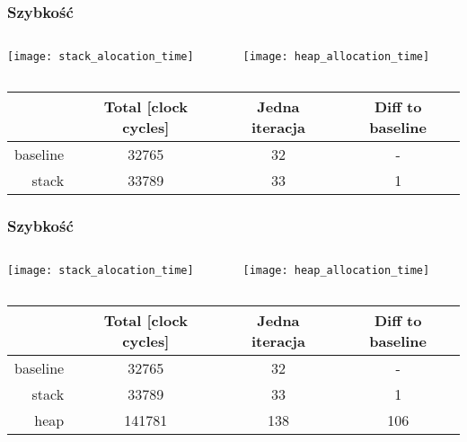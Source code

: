 \documentclass{beamer}
\begin{document}
\begin{frame}[t]
    \frametitle{Szybkość}
    \begin{columns}[t]
        \begin{column}[t]{0.5\textwidth}
            \begin{center}
                \texttt{[image: stack\_alocation\_time]}
            \end{center}
        \end{column}
        \begin{column}[t]{0.5\textwidth}
            \begin{center}
                \texttt{[image: heap\_allocation\_time]}
            \end{center}
        \end{column}
    \end{columns}
    \begin{center}
        \begin{tabular}{|| r | c | c | c ||}
        \hline
         & Total [clock cycles] & Jedna iteracja & Diff to baseline \\ [0.2ex] 
        \hline
        \hline
        baseline & 32765 & 32 & - \\
        \hline
        stack & 33789 & 33 & 1 \\
        \hline
        \end{tabular}
    \end{center}
\end{frame}
\begin{frame}[t]
    \frametitle{Szybkość}
    \begin{columns}[t]
        \begin{column}[t]{0.5\textwidth}
            \begin{center}
                \texttt{[image: stack\_alocation\_time]}
            \end{center}
        \end{column}
        \begin{column}[t]{0.5\textwidth}
            \begin{center}
                \texttt{[image: heap\_allocation\_time]}
            \end{center}
        \end{column}
    \end{columns}
    \begin{center}
        \begin{tabular}{|| r | c | c | c ||}
        \hline
         & Total [clock cycles] & Jedna iteracja & Diff to baseline \\ [0.2ex] 
        \hline
        \hline
        baseline & 32765 & 32 & - \\
        \hline
        stack & 33789 & 33 & 1 \\
        \hline
        heap & 141781 & 138 & 106 \\
        \hline
        \end{tabular}
    \end{center}
\end{frame}
\end{document}
